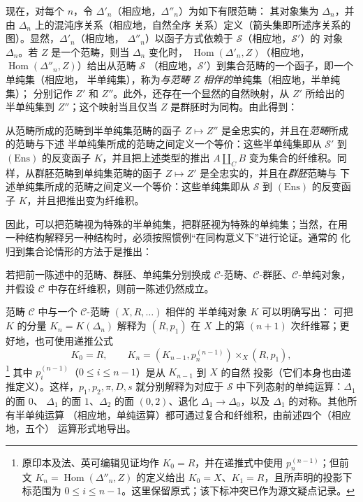 现在，对每个 $n$，令 $\Delta'_n$（相应地，$\Delta''_n$）为如下有限范畴：
其对象集为 $\Delta_n$，并由 $\Delta_n$ 上的混沌序关系（相应地，自然全序
关系）定义（箭头集即所述序关系的图）。显然，$\Delta'_n$（相应地，
$\Delta''_n$）以函子方式依赖于 $\mathcal S$（相应地，$\mathcal S'$）的
对象 $\Delta_n$。若 $Z$ 是一个范畴，则当 $\Delta_n$ 变化时，
$\operatorname{Hom}(\Delta'_n,Z)$（相应地，
$\operatorname{Hom}(\Delta''_n,Z)$）给出从范畴 $\mathcal S$
（相应地，$\mathcal S'$）到集合范畴的一个函子，即一个单纯集（相应地，
半单纯集），称为\emph{与范畴 $Z$ 相伴的}单纯集（相应地，半单纯集）；
分别记作 $Z'$ 和 $Z''$。此外，还存在一个显然的自然映射，从 $Z'$ 所给出的
半单纯集到 $Z''$；这个映射当且仅当 $Z$ 是群胚时为同构。由此得到：

 从范畴所成的范畴到半单纯集范畴的函子
$Z\longmapsto Z''$ 是全忠实的，并且在\emph{范畴}所成的范畴与下述
半单纯集所成的范畴之间定义一个等价：这些半单纯集即从 $\mathcal S'$ 到
$(\mathrm{Ens})$ 的反变函子 $K$，并且把上述类型的推出
$A\amalg_C B$ 变为集合的纤维积。同样，从群胚范畴到单纯集范畴的函子
$Z\longmapsto Z'$ 是全忠实的，并且在\emph{群胚}范畴与
下述单纯集所成的范畴之间定义一个等价：这些单纯集即从 $\mathcal S$ 到
$(\mathrm{Ens})$ 的反变函子 $K$，并且把推出变为纤维积。

因此，可以把范畴视为特殊的半单纯集，把群胚视为特殊的单纯集；当然，在用
一种结构解释另一种结构时，必须按照惯例“在同构意义下”进行论证。通常的
化归到集合论情形的方法于是推出：

 若把前一陈述中的范畴、群胚、单纯集分别换成
$\mathcal C$-范畴、$\mathcal C$-群胚、$\mathcal C$-单纯对象，并假设
$\mathcal C$ 中存在纤维积，则前一陈述仍然成立。

范畴 $\mathcal C$ 中与一个 $\mathcal C$-范畴 $(X,R,\ldots)$ 相伴的
半单纯对象 $K$ 可以明确写出：
可把 $K$ 的分量 $K_n=K(\Delta_n)$ 解释为 $(R,p_1)$ 在 $X$ 上的第
$(n+1)$ 次纤维幂；更好地，也可使用递推公式
\[
  K_0=R,\qquad
  K_n=(K_{n-1},p_n^{(n-1)})\times_X(R,p_1),
\]
\footnote{原印本及法、英可编辑见证均作 $K_0=R$，并在递推式中使用
$p_n^{(n-1)}$；但前文 $K_n=\operatorname{Hom}(\Delta''_n,Z)$ 的定义给出
$K_0=X$、$K_1=R$，且所声明的投影下标范围为
$0\leq i\leq n-1$。这里保留原式；该下标冲突已作为源文疑点记录。}
其中 $p_i^{(n-1)}$（$0\leq i\leq n-1$）是从 $K_{n-1}$ 到 $X$ 的自然
投影（它们本身也由递推定义）。这样，$p_1,p_2,\pi,D,s$ 就分别解释为对应于
$\mathcal S$ 中下列态射的单纯运算：$\Delta_1$ 的面 $0$、
$\Delta_1$ 的面 $1$、$\Delta_2$ 的面 $(0,2)$、退化
$\Delta_1\to\Delta_0$，以及 $\Delta_1$ 的对称。其他所有半单纯运算
（相应地，单纯运算）都可通过复合和纤维积，由前述四个（相应地，五个）
运算形式地导出。

